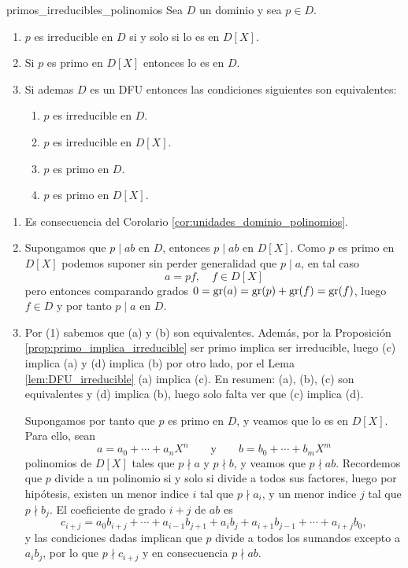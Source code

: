 \begin{lemma}{}{primos_irreducibles_polinomios}
Sea $D$ un dominio y sea $p\in D$.

\begin{enumerate}
    \item $p$ es irreducible en $D$ si y solo si lo es en $D[X]$.
    \item Si $p$ es primo en $D[X]$ entonces lo es en $D$.
    \item Si ademas $D$ es un DFU entonces las condiciones siguientes son equivalentes:
    \begin{enumerate}
        \item $p$ es irreducible en $D$.
        \item $p$ es irreducible en $D[X]$.
        \item $p$ es primo en $D$.
        \item $p$ es primo en $D[X]$.
    \end{enumerate}
\end{enumerate}

\end{lemma}

\begin{proofbox}
\begin{enumerate}
    \item Es consecuencia del Corolario \ref{cor:unidades_dominio_polinomios}.
    \item Supongamos que $p \mid ab$ en $D$, entonces $p \mid ab$ en $D[X]$. Como $p$ es primo en $D[X]$ podemos suponer sin perder generalidad que $p \mid a$, en tal caso
    \[
    a = pf,\quad f \in D[X]
    \] 
    pero entonces comparando grados $0 = \operatorname{gr}(a) = \operatorname{gr}(p) + \operatorname{gr}(f) = \operatorname{gr}(f)$, luego $f \in D$ y por tanto $p \mid a$ en $D$.
    \item Por (1) sabemos que (a) y (b) son equivalentes. Además, por la Proposición \ref{prop:primo_implica_irreducible} ser primo implica ser irreducible, luego (c) implica (a) y (d) implica (b) por otro lado, por el Lema \ref{lem:DFU_irreducible} (a) implica (c). En resumen: (a), (b), (c) son equivalentes y (d) implica (b), luego solo falta ver que (c) implica (d).

    Supongamos por tanto que $p$ es primo en $D$, y veamos que lo es en $D[X]$. Para ello, sean
    \[
    a=a_{0}+\cdots+a_{n}X^{n}\qquad\text{y}\qquad b=b_{0}+\cdots+b_{m}X^{m}
    \]
    polinomios de $D[X]$ tales que $p\nmid a$ y $p\nmid b$, y veamos que $p\nmid ab$. Recordemos que $p$ divide a un polinomio si y solo si divide a todos sus factores, luego por hipótesis, existen un menor indice $i$ tal que $p\nmid a_{i}$, y un menor indice $j$ tal que $p\nmid b_{j}$. El coeficiente de grado $i+j$ de $ab$ es
    \[
    c_{i+j}=a_{0}b_{i+j}+\cdots+a_{i-1}b_{j+1}+a_{i}b_{j}+a_{i+1}b_{j-1}+\cdots+a_{i +j}b_{0},
    \]
    y las condiciones dadas implican que $p$ divide a todos los sumandos excepto a $a_{i}b_{j}$, por lo que $p\nmid c_{i+j}$ y en consecuencia $p\nmid ab$.
\end{enumerate}

\end{proofbox}

